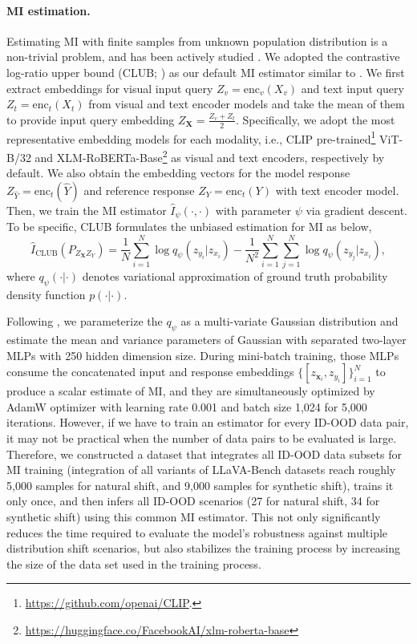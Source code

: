 \paragraph{MI estimation.} Estimating MI with finite samples from unknown population distribution is a non-trivial problem, and has been actively studied \cite{fraser1986independent, paninski2003estimation, kraskov2004estimating, nguyen2010estimating, shwartz2017opening, mine2018, poole2019variational, cheng2020club}. We adopted the contrastive log-ratio upper bound (CLUB; \citet{cheng2020club}) as our default MI estimator similar to \cite{cheng2021fairfil}. We first extract embeddings for visual input query $Z_{v}=\text{enc}_{v}(X_{v})$ and text input query $Z_{t}=\text{enc}_{t}(X_{t})$ from visual and text encoder models and take the mean of them to provide input query embedding $Z_{\mathbf{X}}=\frac{Z_{v}+Z_{t}}{2}$. Specifically, we adopt the most representative embedding models for each modality, i.e., CLIP pre-trained\footnote{ \url{https://github.com/openai/CLIP}.} ViT-B/32 and XLM-RoBERTa-Base\footnote{\url{https://huggingface.co/FacebookAI/xlm-roberta-base}} \cite{conneau2019unsupervised} as visual and text encoders, respectively by default. We also obtain the embedding vectors for the model response $Z_{\hat{Y}}=\text{enc}_{t}(\hat{Y})$ and reference response $Z_{Y}=\text{enc}_{t}(Y)$ with text encoder model. Then, we train the MI estimator $\hat{I}_{\psi}(\cdot,\cdot)$ with parameter $\psi$ via gradient descent. To be specific, CLUB formulates the unbiased estimation for MI as below,
\begin{equation}
    \hat{I}_{\text{CLUB}}(P_{Z_{\mathbf{X}}Z_{Y}})=\frac{1}{N}\sum_{i=1}^{N}\log q_{\psi}(z_{y_{i}}|z_{x_{i}}) - \frac{1}{N^{2}}\sum_{i=1}^{N}\sum_{j=1}^{N}\log q_{\psi}(z_{y_j}|z_{x_{i}}),
\end{equation}
where $q_{\psi}(\cdot|\cdot)$ denotes variational approximation of ground truth probability density function $p(\cdot|\cdot)$. 

Following \cite{cheng2020club, cheng2021fairfil}, we parameterize the $q_{\psi}$ as a multi-variate Gaussian distribution and estimate the mean and variance parameters of Gaussian with separated two-layer MLPs with 250 hidden dimension size. During mini-batch training, those MLPs consume the concatenated input and response embeddings $\{[z_{\mathbf{x}_{i}},z_{y_{i}}]\}_{i=1}^{N}$ to produce a scalar estimate of MI, and they are simultaneously optimized by AdamW optimizer with learning rate 0.001 and batch size 1,024 for 5,000 iterations. 
However, if we have to train an estimator for every ID-OOD data pair, it may not be practical when the number of data pairs to be evaluated is large. Therefore, we constructed a dataset that integrates all ID-OOD data subsets for MI training (integration of all variants of LLaVA-Bench datasets reach roughly 5,000 samples for natural shift, and 9,000 samples for synthetic shift), trains it only once, and then infers all ID-OOD scenarios (27 for natural shift, 34 for synthetic shift) using this common MI estimator. This not only significantly reduces the time required to evaluate the model’s robustness against multiple distribution shift scenarios, but also stabilizes the training process by increasing the size of the data set used in the training process.

